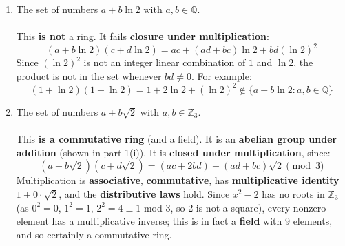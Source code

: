 \documentclass{article}
\newcommand{\Q}{\mathbb{Q}}
\newcommand{\Zn}[1]{\mathbb{Z}_{#1}}
\begin{document}
\begin{enumerate}
\begin{enumerate}
            \item The set of numbers $a + b\ln 2$ with $a,b \in \Q$.
            \\
            \\ This \textbf{is not} a ring. It fails \textbf{closure under multiplication}:
            \[
                (a + b\ln 2)(c + d\ln 2) = ac + (ad+bc)\ln 2 + bd(\ln 2)^2
            \]
            Since $(\ln 2)^2$ is not an integer linear combination of $1$ and $\ln 2$, the product is not in the set whenever $bd \neq 0$. For example:
            \[
                (1 + \ln 2)(1 + \ln 2) = 1 + 2\ln 2 + (\ln 2)^2 \notin \{a + b\ln 2 : a,b \in \Q\}
            \]

            \item The set of numbers $a + b\sqrt{2}$ with $a,b \in \Zn{3}$.
            \\
            \\ This \textbf{is a commutative ring} (and a field). It is an \textbf{abelian group under addition} (shown in part 1(i)). It is \textbf{closed under multiplication}, since:
            \[
                (a+b\sqrt{2})(c+d\sqrt{2}) = (ac+2bd) + (ad+bc)\sqrt{2} \pmod{3}
            \]
            Multiplication is \textbf{associative}, \textbf{commutative}, has \textbf{multiplicative identity} $1+0\cdot\sqrt{2}$, and the \textbf{distributive laws} hold. Since $x^2-2$ has no roots in $\Zn{3}$ (as $0^2=0$, $1^2=1$, $2^2=4\equiv 1$ mod 3, so 2 is not a square), every nonzero element has a multiplicative inverse; this is in fact a \textbf{field} with 9 elements, and so certainly a commutative ring.


\end{enumerate}
\end{enumerate}
\end{document}
